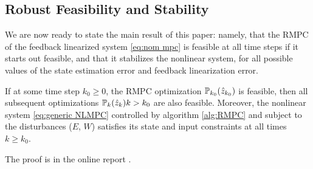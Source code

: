 \subsection{Robust Feasibility and Stability}
We are now ready to state the main result of this paper: namely, that the RMPC of the feedback linearized system \eqref{eq:nom mpc} is feasible at all time steps if it starts out feasible, and that it stabilizes the nonlinear system, for all possible values of the state estimation error and feedback linearization error.

\begin{theorem}
\label{th:robust_feas}
If at some time step $k_0 \geq 0$, the RMPC optimization $\mathbb{P}_{k_0}(\hat{z}_{k_0})$ is feasible, then all subsequent optimizations  $\mathbb{P}_{k}(\hat{z}_{k}) k> k_0$ are also feasible.
Moreover, the nonlinear system \eqref{eq:generic NLMPC} controlled by algorithm \ref{alg:RMPC} and subject to the disturbances ($E$, $W$) satisfies its state and input constraints at all times $k \geq k_0$.
\end{theorem}
The proof is in the online report \cite{PantAM16_RMPC}.